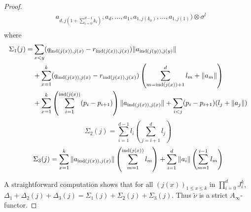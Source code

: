 \documentclass[12pt]{article}
\begin{document}
\begin{proof}
\begin{align*}
		&a_{d,j(1+\sum_{i=0}^{d-1}k_i)},a_d,\dots,a_1,a_{1,j(k_0)},\dots,a_{1,j(1)})\otimes \sigma^l \\
	\end{align*}
	where
	\begin{align*} \Sigma_1(j) =& \sum_{x<y} (q_{\textup{ind}(j(x)),j(x)} - r_{\textup{ind}(j(x)),j(x)}) \|a_{\textup{ind}(j(y)),j(y)}\| \\
		&+ \sum_{x=1}^{k} (q_{\textup{ind}(j(x)),j(x)} - r_{\textup{ind}(j(x)),j(x)}) \left(\sum_{m=\textup{ind}(j(x))+1}^{d} l_m + \|a_m\|\right) \\
		& + \sum_{x=1}^{k} \left(\sum_{i=1}^{\textup{ind}(j(x))}(p_i - p_{i+1})\right) \| a_{\textup{ind}(j(x)),j(x)} \| + \sum_{i<j} (p_i-p_{i+1})(l_j + \|a_j\|) \end{align*}
	\[\Sigma_2(j) = \sum_{i=1}^{d-1} l_i \left(\sum_{j=i+1}^{d} l_j\right) \]
	\[\Sigma_3(j) = \sum_{x=1}^{k} \|a_{\textup{ind}(j(x)),j(x)}\| \left(\sum_{m=1}^{\textup{ind}(j(x))} l_m \right) + \sum_{i=1}^{d} \|a_i\| \left(\sum_{m=1}^{i-1} l_m\right)\]
	
	A straightforward computation shows that for all $(j(x))_{1\leq x \leq k}$ in $\prod_{i=0}^d J_i^k$, $\Delta_1 + \Delta_2(j) + \Delta_3(j) = \Sigma_1(j)+\Sigma_2(j) + \Sigma_3(j)$. Thus $\tilde{\nu}$ is a strict $A_\infty$-functor.
	
	\end{proof}
	
	
	
\end{document}
